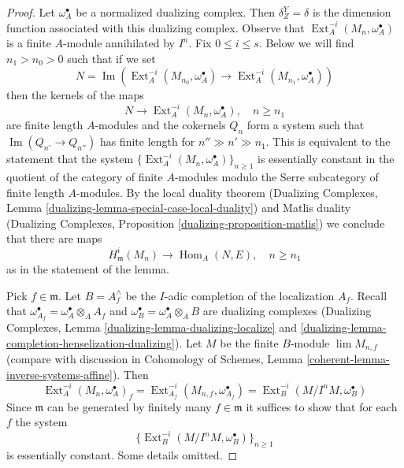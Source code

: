 \documentclass{stacks-project}
\theoremstyle{plain}
\theoremstyle{definition}
\theoremstyle{remark}
\numberwithin{equation}{subsection}
\def\lim{\mathop{\mathrm{lim}}\nolimits}
\def\Hom{\mathop{\mathrm{Hom}}\nolimits}
\def\Ext{\mathop{\mathrm{Ext}}\nolimits}
\def\Im{\mathop{\mathrm{Im}}}
\begin{document}
\begin{proof}
Let $\omega_A^\bullet$ be a normalized dualizing complex. Then
$\delta^Y_Z = \delta$ is the dimension function associated with
this dualizing complex.
Observe that $\Ext^{-i}_A(M_n, \omega_A^\bullet)$ is a finite $A$-module
annihilated by $I^n$. Fix $0 \leq i \leq s$.
Below we will find $n_1 > n_0 > 0$ such that if we set
$$
N = \Im(\Ext^{-i}_A(M_{n_0}, \omega_A^\bullet) \to
\Ext^{-i}_A(M_{n_1}, \omega_A^\bullet))
$$
then the kernels of the maps
$$
N \to \Ext^{-i}_A(M_n, \omega_A^\bullet),\quad n \geq n_1
$$
are finite length $A$-modules and the cokernels $Q_n$ form a
system such that $\Im(Q_{n'} \to Q_{n''})$ has finite length
for $n'' \gg n' \gg n_1$. This is equivalent to the statement that
the system $\{\Ext^{-i}_A(M_n, \omega_A^\bullet)\}_{n \geq 1}$
is essentially constant in the quotient of the category of finite
$A$-modules modulo the Serre subcategory of finite length $A$-modules.
By the local duality theorem
(Dualizing Complexes, Lemma \ref{dualizing-lemma-special-case-local-duality})
and Matlis duality
(Dualizing Complexes, Proposition \ref{dualizing-proposition-matlis})
we conclude that there are maps
$$
H^i_\mathfrak m(M_n) \to \Hom_A(N, E),\quad n \geq n_1
$$
as in the statement of the lemma.

\medskip\noindent
Pick $f \in \mathfrak m$. Let $B = A_f^\wedge$ be the $I$-adic completion
of the localization $A_f$. Recall that
$\omega_{A_f}^\bullet = \omega_A^\bullet \otimes_A A_f$
and $\omega_B^\bullet = \omega_A^\bullet \otimes_A B$ are dualizing
complexes (Dualizing Complexes, Lemma \ref{dualizing-lemma-dualizing-localize}
and \ref{dualizing-lemma-completion-henselization-dualizing}).
Let $M$ be the finite $B$-module $\lim M_{n, f}$ (compare with
discussion in Cohomology of Schemes, Lemma
\ref{coherent-lemma-inverse-systems-affine}). Then
$$
\Ext^{-i}_A(M_n, \omega_A^\bullet)_f =
\Ext^{-i}_{A_f}(M_{n, f}, \omega_{A_f}^\bullet) =
\Ext^{-i}_B(M/I^n M, \omega_B^\bullet)
$$
Since $\mathfrak m$ can be generated by finitely many $f \in \mathfrak m$
it suffices to show that for each $f$ the system
$$
\{\Ext^{-i}_B(M/I^n M, \omega_B^\bullet)\}_{n \geq 1}
$$
is essentially constant. Some details omitted.


\end{proof}
\end{document}
